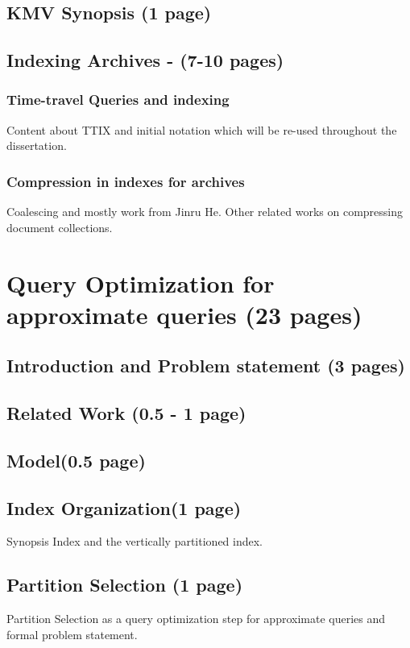 \documentclass[12pt]{article}
\begin{document}
			\subsection{KMV Synopsis (1 page)} 
	

	\subsection{Indexing Archives - (7-10 pages)}
		\subsubsection{Time-travel Queries and indexing}
			Content about TTIX and initial notation which will be re-used throughout the dissertation.
		\subsubsection{Compression in indexes for archives}
			Coalescing and mostly work from Jinru He. Other related works on compressing document collections.


\newpage
\section{Query Optimization for approximate queries (23 pages)}
	
	\subsection{Introduction and Problem statement (3 pages)}
	
	\subsection{Related Work (0.5 - 1 page)}
	
	\subsection{Model(0.5 page)}

	\subsection{Index Organization(1 page)}
		Synopsis Index and the vertically partitioned index.

	\subsection{Partition Selection (1 page)}
		Partition Selection as a query optimization step for approximate queries and formal problem statement.
\end{document}
